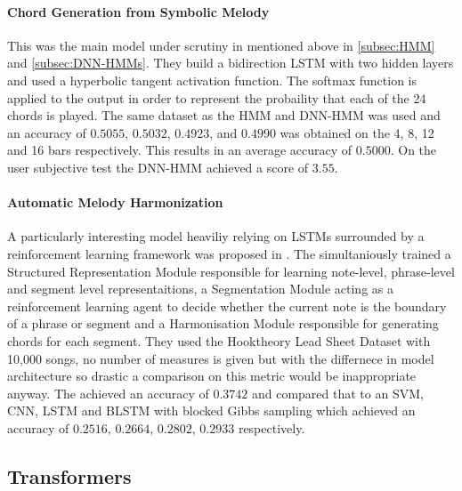 \paragraph{Chord Generation from Symbolic Melody} This was the main model under scrutiny in \cite{BLSTM} mentioned above in \ref{subsec:HMM} and \ref{subsec:DNN-HMMs}.
They build a bidirection LSTM with two hidden layers and used a hyperbolic tangent activation function. The softmax function is applied to the output in order to represent the probaility that each of the 24 chords is played.
The same dataset as the HMM and DNN-HMM was used and an accuracy of $0.5055$, $0.5032$, $0.4923$, and $0.4990$  was obtained on the 4, 8, 12 and 16 bars respectively. This results in an average accuracy of $0.5000$.
On the user subjective test the DNN-HMM achieved a score of $3.55$.

\paragraph{Automatic Melody Harmonization} A particularly interesting model heaviliy relying on LSTMs surrounded by a reinforcement learning framework was proposed in \cite{ReinforcementLearning}.
The simultaniously trained a Structured Representation Module responsible for learning note-level, phrase-level and segment level representaitions, a Segmentation Module acting as a reinforcement learning agent to decide whether the current note is the boundary of a phrase or segment and a Harmonisation Module responsible for generating chords for each segment.
They used the Hooktheory Lead Sheet Dataset with 10,000 songs, no number of measures is given but with the differnece in model architecture so drastic a comparison on this metric would be inappropriate anyway.
The achieved an accuracy of $0.3742$ and compared that to an SVM, CNN, LSTM and BLSTM with blocked Gibbs sampling which achieved an accuracy of $0.2516$, $0.2664$, $0.2802$, $0.2933$ respectively.

\subsection{Transformers}

